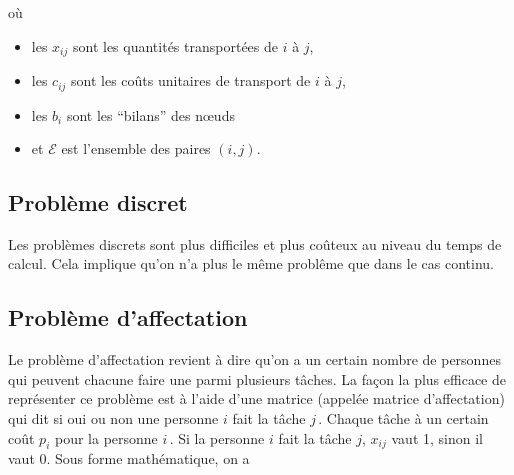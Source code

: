 	où

	\begin{itemize}
		\item les $x_{ij}$ sont les quantités transportées de $i$ à $j$,
		\item les $c_{ij}$ sont les coûts unitaires de transport
		de $i$ à $j$,
		\item les $b_i$ sont les ``bilans'' des n\oe{}uds
		\item et $\mathcal{E}$ est l'ensemble des paires $(i,j)$.
	\end{itemize}

\subsection{Problème discret}

	Les problèmes discrets sont plus difficiles et plus coûteux
	au niveau du temps de calcul.
	Cela implique qu'on n'a plus le même problême que dans le cas continu.

\subsection{Problème d'affectation}
\label{sec:affectation}

	\begin{center}
	\end{center}

	Le problème d'affectation revient à dire
	qu'on a un certain nombre de personnes
	qui peuvent chacune faire une parmi plusieurs tâches.
	La façon la plus efficace de représenter ce problème
	est à l'aide d'une matrice (appelée matrice d'affectation)
	qui dit si oui ou non une personne $i$
	fait la tâche $j\,$.
	Chaque tâche à un certain coût $p_i$ pour la personne $i\,$.
	Si la personne $i$ fait la tâche $j$, $x_{ij}$ vaut 1,
	sinon il vaut 0.
	Sous forme mathématique, on a

